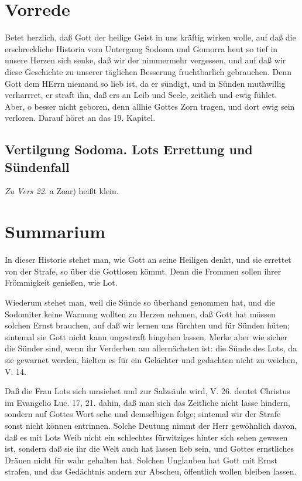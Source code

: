 \section{Vorrede}

Betet herzlich, daß Gott der heilige Geist in uns kräftig wirken wolle, auf daß die erschreckliche Historia vom Untergang Sodoma und Gomorra heut so tief in unsere Herzen sich senke, daß wir der nimmermehr vergessen, und auf daß wir diese Geschichte zu unserer täglichen Besserung fruchtbarlich gebrauchen. Denn Gott dem HErrn niemand so lieb ist, da er sündigt, und in Sünden muthwillig verharrret, er straft ihn, daß ers an Leib und Seele, zeitlich und ewig fühlet. Aber, o besser nicht geboren, denn allhie Gottes Zorn tragen, und dort ewig sein verloren. Darauf höret an das 19. Kapitel.

\subsection{Vertilgung Sodoma. Lots Errettung und Sündenfall}

\emph{Zu Vers 22.} a Zoar) heißt klein.

\section{Summarium}

In dieser Historie stehet man, wie Gott an seine Heiligen denkt, und sie errettet von der Strafe, so über die Gottlosen kömmt. Denn die Frommen sollen ihrer Frömmigkeit genießen, wie Lot.

Wiederum stehet man, weil die Sünde so überhand genommen hat, und die Sodomiter keine Warnung wollten zu Herzen nehmen, daß Gott hat müssen solchen Ernst brauchen, auf daß wir lernen uns fürchten und für Sünden hüten; sintemal sie Gott nicht kann ungestraft hingehen lassen. Merke aber wie sicher die Sünder sind, wenn ihr Verderben am allernächsten ist: die Sünde des Lots, da sie gewarnet werden, hielten es für ein Gelächter und gedachten nicht zu weichen, V. 14.

Daß die Frau Lots sich umsiehet und zur Salzsäule wird, V. 26. deutet Christus im Evangelio Luc. 17, 21. dahin, daß man sich das Zeitliche nicht lasse hindern, sondern auf Gottes Wort sehe und demselbigen folge; sintemal wir der Strafe sonst nicht können entrinnen. Solche Deutung nimmt der Herr gewöhnlich davon, daß es mit Lots Weib nicht ein schlechtes fürwitziges hinter sich sehen gewesen ist, sondern daß sie ihr die Welt auch hat lassen lieb sein, und Gottes ernstliches Dräuen nicht für wahr gehalten hat. Solchen Unglauben hat Gott mit Ernst strafen, und das Gedächtnis andern zur Abscheu, öffentlich wollen bleiben lassen.


